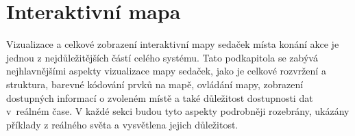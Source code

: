 \section{Interaktivní mapa}
\label{sec:identifikace-interaktivni-mapa}
Vizualizace a celkové zobrazení interaktivní mapy sedaček místa konání akce je jednou z nejdůležitějších částí celého systému.
Tato podkapitola se zabývá nejhlavnějšími aspekty vizualizace mapy sedaček, jako je celkové rozvržení a struktura, barevné kódování prvků na mapě, ovládání mapy, zobrazení dostupných informací o zvoleném místě a také důležitost dostupnosti dat v~reálném čase.
V každé sekci budou tyto aspekty podrobněji rozebrány, ukázány příklady z reálného světa a vysvětlena jejich důležitost.

